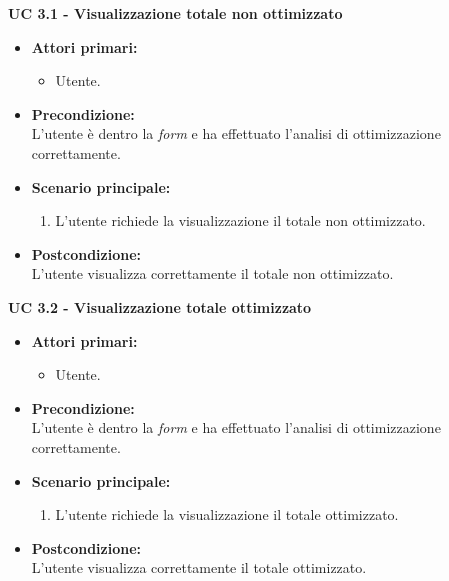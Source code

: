\noindent \textbf{\large UC 3.1 - Visualizzazione totale non ottimizzato}
\label{uc:visualizzazione-totale-non-ottimizzato}
\begin{itemize}

	\item \textbf{Attori primari: }
		\begin{itemize}
			\item Utente.
		\end{itemize}

	\item \textbf{Precondizione: }\\[0.3cm]
		L'utente è dentro la \textit{form} e ha effettuato l'analisi di ottimizzazione correttamente.

	\item \textbf{Scenario principale: }
		\begin{enumerate}
			\item L'utente richiede la visualizzazione il totale non ottimizzato.
		\end{enumerate}
		

	\item \textbf{Postcondizione: }\\[0.3cm]
		L'utente visualizza correttamente il totale non ottimizzato.

\end{itemize}

\vspace{0.4cm}

\noindent \textbf{\large UC 3.2 - Visualizzazione totale ottimizzato}
\label{uc:visualizzazione-totale-ottimizzato}
\begin{itemize}

	\item \textbf{Attori primari: }
		\begin{itemize}
			\item Utente.
		\end{itemize}

	\item \textbf{Precondizione: }\\[0.3cm]
		L'utente è dentro la \textit{form} e ha effettuato l'analisi di ottimizzazione correttamente.

	\item \textbf{Scenario principale: }
		\begin{enumerate}
			\item L'utente richiede la visualizzazione il totale ottimizzato.
		\end{enumerate}
		

	\item \textbf{Postcondizione: }\\[0.3cm]
		L'utente visualizza correttamente il totale ottimizzato.

\end{itemize}

